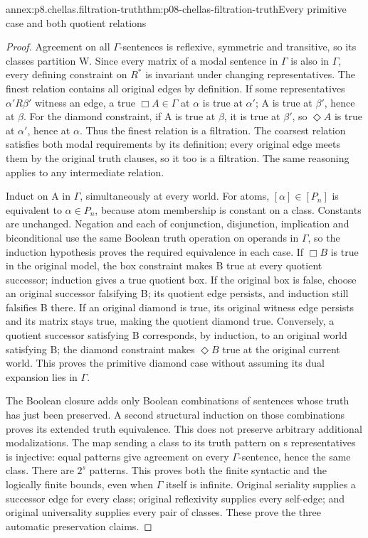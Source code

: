 \begin{annexitem}{annex:p8.chellas.filtration-truth}{thm:p08-chellas-filtration-truth}{Every primitive case and both quotient relations}
\begin{proof}
Agreement on all \(\Gamma\)-sentences is reflexive, symmetric and
transitive, so its classes partition W. Since every matrix of a modal
sentence in \(\Gamma\) is also in \(\Gamma\), every defining
constraint on \(R^*\) is invariant under changing representatives.
The finest relation contains all original edges by definition. If some
representatives \(\alpha' R\beta'\) witness an edge, a true
\(\Box A\in\Gamma\) at \(\alpha\) is true at \(\alpha'\);
A is true at \(\beta'\), hence at \(\beta\). For the diamond
constraint, if A is true at \(\beta\), it is true at \(\beta'\),
so \(\Diamond A\) is true at \(\alpha'\), hence at \(\alpha\).
Thus the finest relation is a filtration. The coarsest relation
satisfies both modal requirements by its definition; every original
edge meets them by the original truth clauses, so it too is a filtration.
The same reasoning applies to any intermediate relation.

Induct on A in \(\Gamma\), simultaneously at every world.
For atoms, \([\alpha]\in[P_n]\) is equivalent to
\(\alpha\in P_n\), because atom membership is constant on a
class. Constants are unchanged. Negation and each of conjunction,
disjunction, implication and biconditional use the same Boolean
truth operation on operands in \(\Gamma\), so the induction
hypothesis proves the required equivalence in each case.
If \(\Box B\) is true in the original model, the box constraint
makes B true at every quotient successor; induction gives a true
quotient box. If the original box is false, choose an original
successor falsifying B; its quotient edge persists, and induction
still falsifies B there. If an original diamond is true, its original
witness edge persists and its matrix stays true, making the quotient
diamond true. Conversely, a quotient successor satisfying B corresponds,
by induction, to an original world satisfying B; the diamond constraint
makes \(\Diamond B\) true at the original current world. This
proves the primitive diamond case without assuming its dual expansion
lies in \(\Gamma\).

The Boolean closure adds only Boolean combinations of sentences
whose truth has just been preserved. A second structural induction
on those combinations proves its extended truth equivalence.
This does not preserve arbitrary additional modalizations.
The map sending a class to its truth pattern on s representatives
is injective: equal patterns give agreement on every
\(\Gamma\)-sentence, hence the same class. There are \(2^s\)
patterns. This proves both the finite syntactic and the logically
finite bounds, even when \(\Gamma\) itself is infinite.
Original seriality supplies a successor edge for every class;
original reflexivity supplies every self-edge; and original
universality supplies every pair of classes. These prove the three
automatic preservation claims.
\end{proof}
\end{annexitem}

